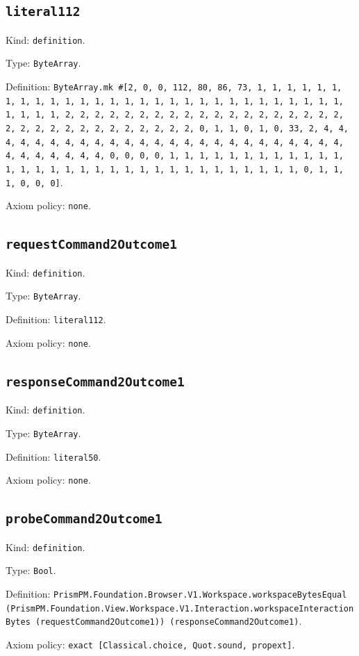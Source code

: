 \documentclass[11pt]{article}
\begin{document}
\subsection*{\texttt{literal112}}
\noindent Kind: \texttt{definition}.\par
\noindent Type: \texttt{ByteArray}.\par
\noindent Definition: \texttt{ByteArray.mk \#[2, 0, 0, 112, 80, 86, 73, 1, 1, 1, 1, 1, 1, 1, 1, 1, 1, 1, 1, 1, 1, 1, 1, 1, 1, 1, 1, 1, 1, 1, 1, 1, 1, 1, 1, 1, 1, 1, 1, 1, 2, 2, 2, 2, 2, 2, 2, 2, 2, 2, 2, 2, 2, 2, 2, 2, 2, 2, 2, 2, 2, 2, 2, 2, 2, 2, 2, 2, 2, 2, 2, 2, 0, 1, 1, 0, 1, 0, 33, 2, 4, 4, 4, 4, 4, 4, 4, 4, 4, 4, 4, 4, 4, 4, 4, 4, 4, 4, 4, 4, 4, 4, 4, 4, 4, 4, 4, 4, 4, 4, 4, 4, 0, 0, 0, 0, 1, 1, 1, 1, 1, 1, 1, 1, 1, 1, 1, 1, 1, 1, 1, 1, 1, 1, 1, 1, 1, 1, 1, 1, 1, 1, 1, 1, 1, 1, 1, 1, 0, 1, 1, 1, 0, 0, 0]}.\par
\noindent Axiom policy: \texttt{none}.\par
\subsection*{\texttt{requestCommand2Outcome1}}
\noindent Kind: \texttt{definition}.\par
\noindent Type: \texttt{ByteArray}.\par
\noindent Definition: \texttt{literal112}.\par
\noindent Axiom policy: \texttt{none}.\par
\subsection*{\texttt{responseCommand2Outcome1}}
\noindent Kind: \texttt{definition}.\par
\noindent Type: \texttt{ByteArray}.\par
\noindent Definition: \texttt{literal50}.\par
\noindent Axiom policy: \texttt{none}.\par
\subsection*{\texttt{probeCommand2Outcome1}}
\noindent Kind: \texttt{definition}.\par
\noindent Type: \texttt{Bool}.\par
\noindent Definition: \texttt{PrismPM.Foundation.Browser.V1.Workspace.workspaceBytesEqual (PrismPM.Foundation.View.Workspace.V1.Interaction.workspaceInteractionBytes (requestCommand2Outcome1)) (responseCommand2Outcome1)}.\par
\noindent Axiom policy: \texttt{exact [Classical.choice, Quot.sound, propext]}.\par
\end{document}
